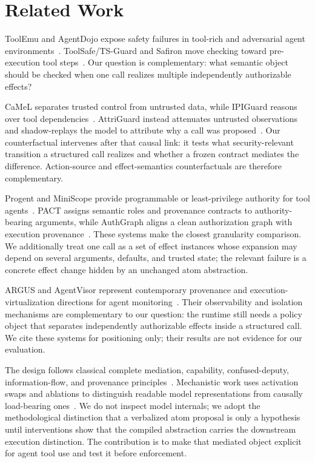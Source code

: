 \documentclass[letterpaper,twocolumn,10pt]{article}
\begin{document}
 \section{Related Work}

ToolEmu and AgentDojo expose safety failures in tool-rich and adversarial agent environments~\cite{toolemu,agentdojo}. ToolSafe/TS-Guard and Safiron move checking toward pre-execution tool steps~\cite{toolsafe,safiron}. Our question is complementary: what semantic object should be checked when one call realizes multiple independently authorizable effects?

CaMeL separates trusted control from untrusted data, while IPIGuard reasons over tool dependencies~\cite{camel,ipiguard}. AttriGuard instead attenuates untrusted observations and shadow-replays the model to attribute why a call was proposed~\cite{attriguard}. Our counterfactual intervenes after that causal link: it tests what security-relevant transition a structured call realizes and whether a frozen contract mediates the difference. Action-source and effect-semantics counterfactuals are therefore complementary.

Progent and MiniScope provide programmable or least-privilege authority for tool agents~\cite{progent,miniscope}. PACT assigns semantic roles and provenance contracts to authority-bearing arguments, while AuthGraph aligns a clean authorization graph with execution provenance~\cite{pact,authgraph}. These systems make the closest granularity comparison. We additionally treat one call as a set of effect instances whose expansion may depend on several arguments, defaults, and trusted state; the relevant failure is a concrete effect change hidden by an unchanged atom abstraction.

ARGUS and AgentVisor represent contemporary provenance and execution-virtualization directions for agent monitoring~\cite{weng2026argus,ying2026agentvisor}. Their observability and isolation mechanisms are complementary to our question: the runtime still needs a policy object that separates independently authorizable effects inside a structured call. We cite these systems for positioning only; their results are not evidence for our evaluation.

The design follows classical complete mediation, capability, confused-deputy, information-flow, and provenance principles~\cite{saltzer1975protection,dennis1966programming,hardy1988confused,denning1976lattice,buneman2001why,cheney2009provenance}. Mechanistic work uses activation swaps and ablations to distinguish readable model representations from causally load-bearing ones~\cite{anthropicworkspace}. We do not inspect model internals; we adopt the methodological distinction that a verbalized atom proposal is only a hypothesis until interventions show that the compiled abstraction carries the downstream execution distinction. The contribution is to make that mediated object explicit for agent tool use and test it before enforcement.
\end{document}
